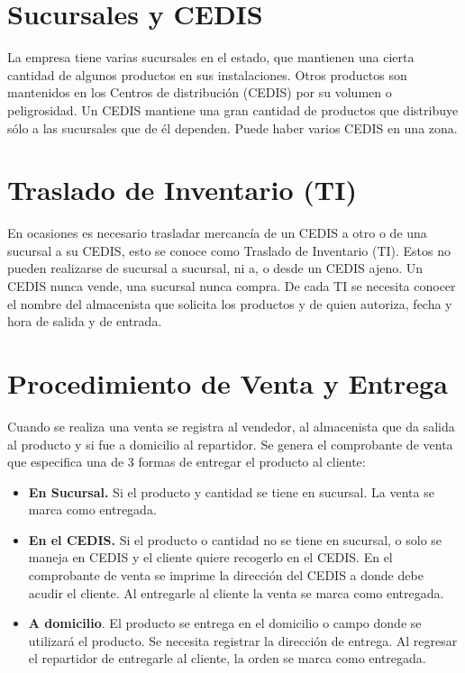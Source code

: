 \documentclass[
  letterpaper,
  DIV=11,
  numbers=noendperiod]{scrreprt}
\providecommand{\tightlist}{%
  \setlength{\itemsep}{0pt}\setlength{\parskip}{0pt}}\usepackage{longtable,booktabs,array}
\begin{document}
\section{Sucursales y CEDIS}\label{sucursales-y-cedis}

La empresa tiene varias sucursales en el estado, que mantienen una
cierta cantidad de algunos productos en sus instalaciones. Otros
productos son mantenidos en los Centros de distribución (CEDIS) por su
volumen o peligrosidad. Un CEDIS mantiene una gran cantidad de productos
que distribuye sólo a las sucursales que de él dependen. Puede haber
varios CEDIS en una zona.

\section{Traslado de Inventario (TI)}\label{traslado-de-inventario-ti}

En ocasiones es necesario trasladar mercancía de un CEDIS a otro o de
una sucursal a su CEDIS, esto se conoce como Traslado de Inventario
(TI). Estos no pueden realizarse de sucursal a sucursal, ni a, o desde
un CEDIS ajeno. Un CEDIS nunca vende, una sucursal nunca compra. De cada
TI se necesita conocer el nombre del almacenista que solicita los
productos y de quien autoriza, fecha y hora de salida y de entrada.

\section{Procedimiento de Venta y
Entrega}\label{procedimiento-de-venta-y-entrega}

Cuando se realiza una venta se registra al vendedor, al almacenista que
da salida al producto y si fue a domicilio al repartidor. Se genera el
comprobante de venta que especifica una de 3 formas de entregar el
producto al cliente:

\begin{itemize}
\tightlist
\item
  \textbf{En Sucursal.} Si el producto y cantidad se tiene en sucursal.
  La venta se marca como entregada.
\item
  \textbf{En el CEDIS.} Si el producto o cantidad no se tiene en
  sucursal, o solo se maneja en CEDIS y el cliente quiere recogerlo en
  el CEDIS. En el comprobante de venta se imprime la dirección del CEDIS
  a donde debe acudir el cliente. Al entregarle al cliente la venta se
  marca como entregada.
\item
  \textbf{A domicilio}. El producto se entrega en el domicilio o campo
  donde se utilizará el producto. Se necesita registrar la dirección de
  entrega. Al regresar el repartidor de entregarle al cliente, la orden
  se marca como entregada.
\end{itemize}
\end{document}
